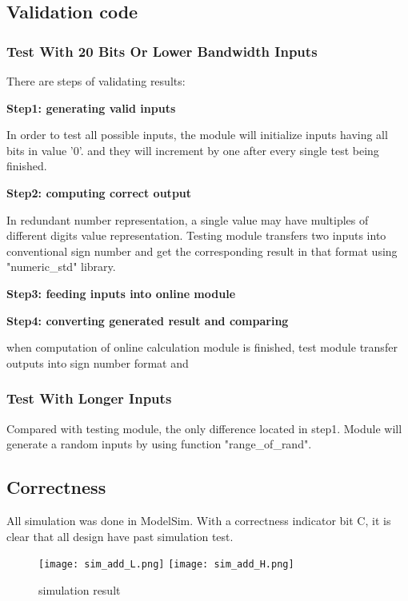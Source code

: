 \documentclass[10pt]{article}
\begin{document}
\subsection{Validation code}

\subsubsection{Test With 20 Bits Or Lower Bandwidth Inputs}

There are steps of validating results:

{\large\bfseries Step1: generating valid inputs}

In order to test all possible inputs, the module will initialize inputs having all bits in value '0'. and they will increment by one after every single test being finished.  

{\large\bfseries Step2: computing correct output}

In redundant number representation,  a single value may have multiples of different digits value representation. Testing module transfers two inputs into conventional sign number and get the corresponding result in that format using "numeric\_std" library.

{\large\bfseries Step3: feeding inputs into online module}

{\large\bfseries Step4: converting generated result and comparing}

when computation of online calculation module is finished, test module transfer outputs into sign number format and 


\subsubsection{Test With Longer Inputs}

Compared with testing module, the only difference located in step1. Module will generate a random inputs by using function "range\_of\_rand".

\subsection{Correctness}

All simulation was done in ModelSim. With a correctness indicator bit C, it is clear that all design have past simulation test.
     \begin{figure}[H]
       \centering
       \texttt{[image: sim\_add\_L.png]}
       \texttt{[image: sim\_add\_H.png]}
       \caption{simulation result}
    \end{figure}
    
\end{document}
